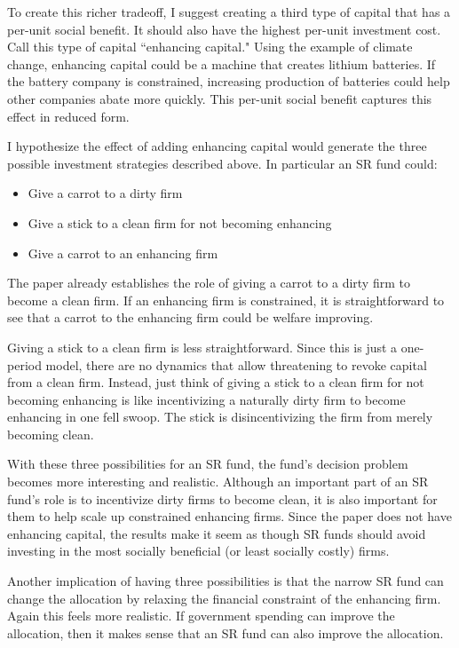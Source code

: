 \documentclass[12pt]{article}
\begin{document}
To create this richer tradeoff, I suggest creating a third type of capital that has a per-unit social benefit. It should also have the highest per-unit investment cost. Call this type of capital ``enhancing capital." Using the example of climate change, enhancing capital could be a machine that creates lithium batteries. If the battery company is constrained, increasing production of batteries could help other companies abate more quickly. This per-unit social benefit captures this effect in reduced form.

I hypothesize the effect of adding enhancing capital would generate the three possible investment strategies described above. In particular an SR fund could:

\begin{itemize}
    \item Give a carrot to a dirty firm
    \item Give a stick to a clean firm for not becoming enhancing
    \item Give a carrot to an enhancing firm
\end{itemize}

The paper already establishes the role of giving a carrot to a dirty firm to become a clean firm. If an enhancing firm is constrained, it is straightforward to see that a carrot to the enhancing firm could be welfare improving. 

Giving a stick to a clean firm is less straightforward. Since this is just a one-period model, there are no dynamics that allow threatening to revoke capital from a clean firm. Instead, just think of giving a stick to a clean firm for not becoming enhancing is like incentivizing a naturally dirty firm to become enhancing in one fell swoop. The stick is disincentivizing the firm from merely becoming clean.

With these three possibilities for an SR fund, the fund's decision problem becomes more interesting and realistic. Although an important part of an SR fund's role is to incentivize dirty firms to become clean, it is also important for them to help scale up constrained enhancing firms. Since the paper does not have enhancing capital, the results make it seem as though SR funds should avoid investing in the most socially beneficial (or least socially costly) firms.

Another implication of having three possibilities is that the narrow SR fund can change the allocation by relaxing the financial constraint of the enhancing firm. Again this feels more realistic. If government spending can improve the allocation, then it makes sense that an SR fund can also improve the allocation.
\end{document}
